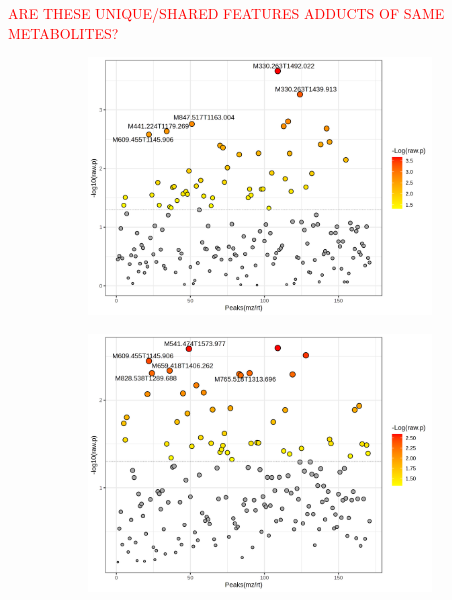 \textcolor{red}{ARE THESE UNIQUE/SHARED FEATURES ADDUCTS OF SAME METABOLITES?}

\begin{figure}[ph!]
    \centering
    \begin{subfigure}[b]{0.49\textwidth}
        \includegraphics[width=\textwidth]{Figures/Sig171FeaturesRedGroupsDroVsConSecondTimePoint_t-test.png}
        \caption{}
        \label{fig:DroVsCon_t-test}
    \end{subfigure}
    \begin{subfigure}[b]{0.49\textwidth}
        \includegraphics[width=\textwidth]{Figures/Sig171FeaturesRedSamplesXvmVsConSecondTimePoint_t_test.png}
        \caption{}
        \label{fig:XvmVsCon_t-test}

\end{subfigure}
\end{figure}
